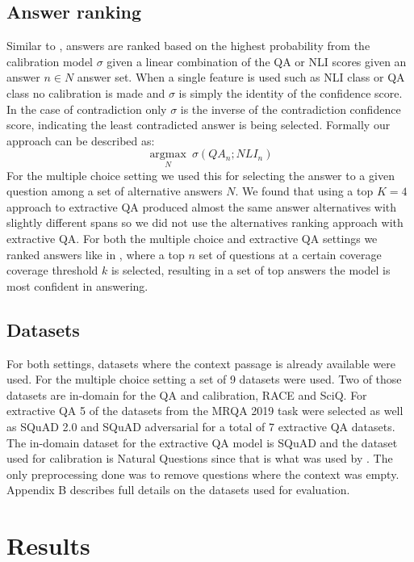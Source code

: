 \documentclass[11pt]{article}
\begin{document}
\subsection{Answer ranking}
Similar to \citet{harabagiu_methods_2006}, answers are ranked based on the highest probability from the calibration model $\sigma$ given a linear combination of the QA or NLI scores given an answer $n \in N$ answer set. When a single feature is used such as NLI class or QA class no calibration is made and $\sigma$ is simply the identity of the confidence score. In the case of contradiction only $\sigma$ is the inverse of the contradiction confidence score, indicating the least contradicted answer is being selected. Formally our approach can be described as:
$$
\underset{N}{\operatorname{argmax}}\:\sigma(QA_n;NLI_n)
$$
For the multiple choice setting we used this for selecting the answer to a given question among a set of alternative answers $N$. We found that using a top $K=4$ approach to extractive QA produced almost the same answer alternatives with slightly different spans so we did not use the alternatives ranking approach with extractive QA. For both the multiple choice and extractive QA settings we ranked answers like in \citet{kamath_selective_2020}, where a top $n$ set of questions at a certain coverage coverage threshold $k$ is selected, resulting in a set of top answers the model is most confident in answering.
\subsection{Datasets}
For both settings, datasets where the context passage is already available were used. For the multiple choice setting a set of 9 datasets were used. Two of those datasets are in-domain for the QA and calibration, RACE and SciQ. For extractive QA 5 of the datasets from the MRQA 2019 task were selected \citep{fisch_mrqa_2019} as well as SQuAD 2.0 \citep{rajpurkar_know_2018} and SQuAD adversarial \citep{jia_adversarial_2017} for a total of 7 extractive QA datasets. The in-domain dataset for the extractive QA model is SQuAD and the dataset used for calibration is Natural Questions since that is what was used by \citet{chen_can_2021}. The only preprocessing done was to remove questions where the context was empty. Appendix B describes full details on the datasets used for evaluation.
\section{Results}
\end{document}

